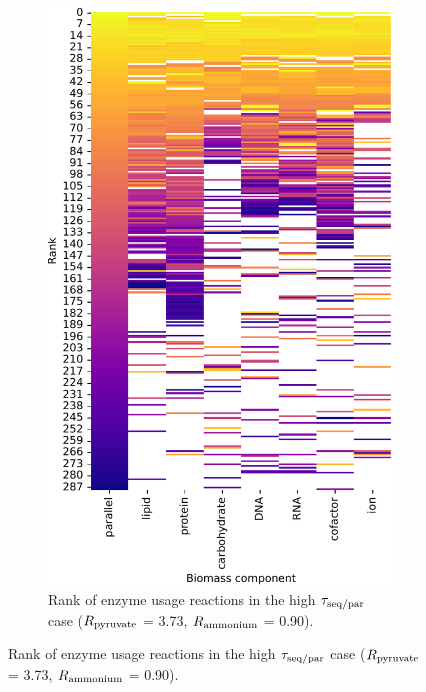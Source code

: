 \begin{figure}
\begin{subfigure}[t]{0.45\textwidth}
    \includegraphics[width=\linewidth]{CompareEnzUse_glc00p00_pyr03p73_amm00p90_1.pdf}
    \caption{
      Rank of enzyme usage reactions in the high $\tau_{\mathrm{seq}/\mathrm{par}}$ case ($R_{\mathrm{pyruvate}}$ = \SI{3.73}{\mmolgdwh}, $R_{\mathrm{ammonium}}$ = \SI{0.90}{\mmolgdwh}).
    }
    \label{fig:model-rank-pyr-highratio-rank}
  \end{subfigure}


\end{figure}
